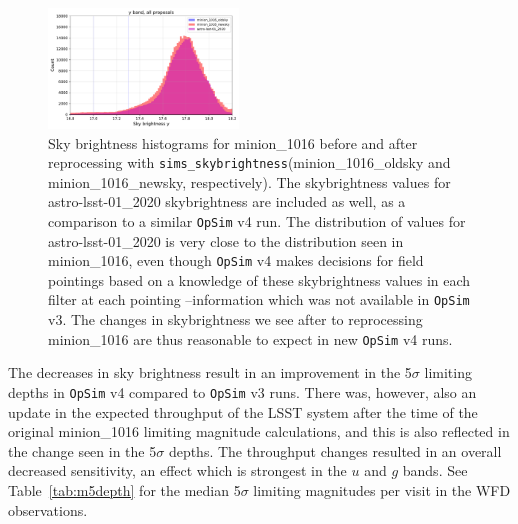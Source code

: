 \documentclass[DM,lsstdraft,authoryear,toc]{lsstdoc}
\newcommand{\opsim}{\texttt{OpSim}\xspace}
\newcommand{\simsky}{\texttt{sims\_skybrightness}\xspace}
\begin{document}
\begin{figure}[ht]
\includegraphics[width=0.45\textwidth]{figures/skybrightness_y_band_ONED_ComboBinnedData}
\caption{Sky brightness histograms for minion\_1016 before and after  reprocessing with \simsky (minion\_1016\_oldsky and minion\_1016\_newsky, respectively).  The skybrightness values for astro-lsst-01\_2020 skybrightness are included as well, as a comparison to a similar \opsim v4 run. The distribution of values for astro-lsst-01\_2020 is very close to the distribution seen in minion\_1016, even though \opsim v4 makes decisions for field pointings based on a knowledge of these skybrightness values in each filter at each pointing --information which was not available in \opsim v3. The changes in skybrightness we see after to reprocessing minion\_1016 are thus reasonable to expect in new \opsim v4 runs.
\label{fig:skybrightness}}
\end{figure}

The decreases in sky brightness result in an improvement in the 5$\sigma$ limiting depths in \opsim v4 compared to \opsim v3 runs. There was, however, also an update in the expected throughput of the LSST system after the time of the original minion\_1016 limiting magnitude calculations, and this is also reflected in the change seen in the 5$\sigma$ depths. The throughput changes resulted in an overall decreased sensitivity, an effect which is strongest in the $u$ and $g$ bands. See Table~\ref{tab:m5depth} for the median 5$\sigma$ limiting magnitudes per visit in the WFD observations.
\end{document}
